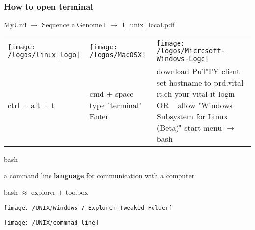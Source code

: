 \documentclass[xcolor=dvipsnames]{beamer}
\begin{document}
\begin{frame}
	\frametitle{How to open terminal}

	\begin{center}
		MyUnil $\rightarrow$ Sequence a Genome I $\rightarrow$ 1\_unix\_local.pdf
	\end{center}

	\small
	\begin{tabular}{C{0.3\textwidth} | C{0.3\textwidth} | C{0.3\textwidth}}
	 	 \texttt{[image: /logos/linux\_logo]} &
		 \texttt{[image: /logos/MacOSX]} &
		 \texttt{[image: /logos/Microsoft-Windows-Logo]} \\
		 ctrl + alt + t &
		 cmd + space \newline type "terminal" \newline Enter &
		 download PuTTY client \newline set hostname to prd.vital-it.ch \newline your vital-it login \newline
		 ~ \newline OR \newline ~ \newline
		 allow "Windows Subsystem for Linux (Beta)" \newline start menu $\rightarrow$ bash\\
	\end{tabular}

\end{frame}


\begin{frame}
	\Huge
	\begin{center}
		bash
	\end{center}
	\large
	a command line \textbf{language} for communication with a computer
\end{frame}

\begin{frame}
	bash $\approx$ explorer + toolbox
	\begin{center}
		\texttt{[image: /UNIX/Windows-7-Explorer-Tweaked-Folder]}
	\end{center}
\end{frame}

\begin{frame}
	\begin{center}
		\texttt{[image: /UNIX/commnad\_line]}
	\end{center}
\end{frame}
\end{document}
